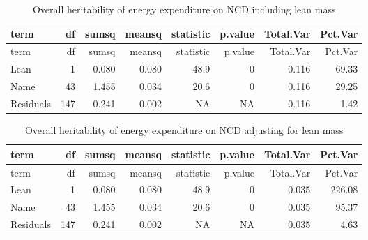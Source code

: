 \documentclass[]{article}
\newenvironment{Shaded}{\begin{snugshade}}{\end{snugshade}}
\newcommand{\DataTypeTok}[1]{\textcolor[rgb]{0.13,0.29,0.53}{#1}}
\newcommand{\DecValTok}[1]{\textcolor[rgb]{0.00,0.00,0.81}{#1}}
\newcommand{\KeywordTok}[1]{\textcolor[rgb]{0.13,0.29,0.53}{\textbf{#1}}}
\newcommand{\NormalTok}[1]{#1}
\newcommand{\OperatorTok}[1]{\textcolor[rgb]{0.81,0.36,0.00}{\textbf{#1}}}
\newcommand{\StringTok}[1]{\textcolor[rgb]{0.31,0.60,0.02}{#1}}
\begin{document}
\begin{longtable}[]{@{}lrrrrrrr@{}}
\caption{Overall heritability of energy expenditure on NCD including
lean mass}\tabularnewline
\toprule
term & df & sumsq & meansq & statistic & p.value & Total.Var &
Pct.Var\tabularnewline
\midrule
\endfirsthead
\toprule
term & df & sumsq & meansq & statistic & p.value & Total.Var &
Pct.Var\tabularnewline
\midrule
\endhead
Lean & 1 & 0.080 & 0.080 & 48.9 & 0 & 0.116 & 69.33\tabularnewline
Name & 43 & 1.455 & 0.034 & 20.6 & 0 & 0.116 & 29.25\tabularnewline
Residuals & 147 & 0.241 & 0.002 & NA & NA & 0.116 & 1.42\tabularnewline
\bottomrule
\end{longtable}

\begin{Shaded}
\end{Shaded}

\begin{longtable}[]{@{}lrrrrrrr@{}}
\caption{Overall heritability of energy expenditure on NCD adjusting for
lean mass}\tabularnewline
\toprule
term & df & sumsq & meansq & statistic & p.value & Total.Var &
Pct.Var\tabularnewline
\midrule
\endfirsthead
\toprule
term & df & sumsq & meansq & statistic & p.value & Total.Var &
Pct.Var\tabularnewline
\midrule
\endhead
Lean & 1 & 0.080 & 0.080 & 48.9 & 0 & 0.035 & 226.08\tabularnewline
Name & 43 & 1.455 & 0.034 & 20.6 & 0 & 0.035 & 95.37\tabularnewline
Residuals & 147 & 0.241 & 0.002 & NA & NA & 0.035 & 4.63\tabularnewline
\bottomrule
\end{longtable}
\end{document}
